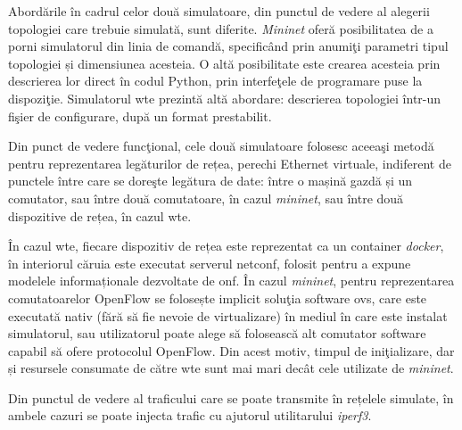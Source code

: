 Abordările în cadrul celor două simulatoare, din punctul de vedere al alegerii topologiei care trebuie simulată, sunt diferite. \textit{Mininet} oferă posibilitatea de a porni simulatorul din linia de comandă, specificând prin anumiţi parametri tipul topologiei și dimensiunea acesteia. O altă posibilitate este crearea acesteia prin descrierea lor direct în codul Python, prin interfeţele de programare puse la dispoziţie. Simulatorul \gls{wte} prezintă altă abordare: descrierea topologiei într-un fişier de configurare, după un format prestabilit.

Din punct de vedere funcţional, cele două simulatoare folosesc aceeaşi metodă pentru reprezentarea legăturilor de rețea, perechi Ethernet virtuale, indiferent de punctele între care se doreşte legătura de date: între o mașină gazdă și un comutator, sau între două comutatoare, în cazul \textit{mininet}, sau între două dispozitive de rețea, în cazul \gls{wte}.

În cazul \gls{wte}, fiecare dispozitiv de rețea este reprezentat ca un container \textit{docker}, în interiorul căruia este executat serverul \gls{netconf}, folosit pentru a expune modelele informaționale dezvoltate de \gls{onf}. În cazul \textit{mininet}, pentru reprezentarea comutatoarelor OpenFlow se folosește implicit soluţia software \gls{ovs}, care este executată nativ (fără să fie nevoie de virtualizare) în mediul în care este instalat simulatorul, sau utilizatorul poate alege să folosească alt comutator software capabil să ofere protocolul OpenFlow. Din acest motiv, timpul de iniţializare, dar și resursele consumate de către \gls{wte} sunt mai mari decât cele utilizate de \textit{mininet}.

Din punctul de vedere al traficului care se poate transmite în rețelele simulate, în ambele cazuri se poate injecta trafic cu ajutorul utilitarului \textit{iperf3}.
